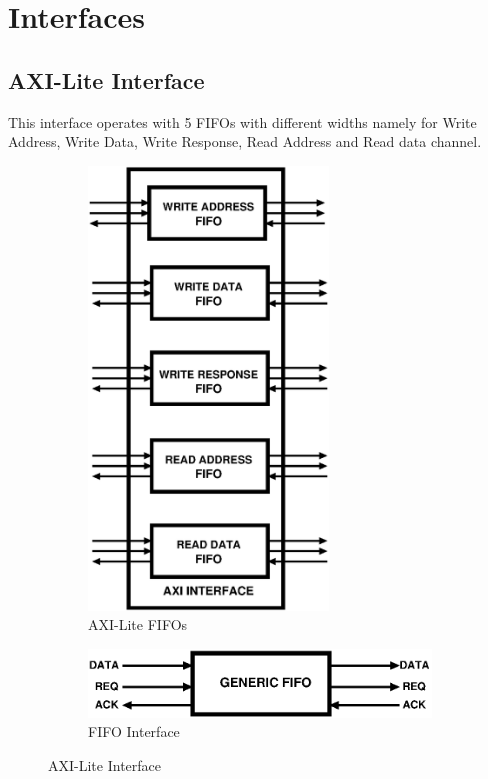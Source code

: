 \chapter{Interfaces}

\section{AXI-Lite Interface}

This interface operates with 5 FIFOs with different widths namely for Write Address, Write Data, Write Response, Read Address and Read data
channel.

\begin{figure}[H]
	\centering
	\begin{subfigure}[b]{0.5\textwidth}
	\centering
	\includegraphics[width=0.7\textwidth]{eps_pdf_sources/ajit_fpga/AFB_AXI_bridge/AXI_internal_FIFOs}
	\caption{AXI-Lite FIFOs}
	\end{subfigure}
	\hfill
	\begin{subfigure}[b]{0.45\textwidth}
	\centering
	\includegraphics[width=\textwidth]{eps_pdf_sources/ajit_fpga/AFB_AXI_bridge/FIFO}
	\caption{FIFO Interface}
	\end{subfigure}
\caption{AXI-Lite Interface}
\end{figure}

